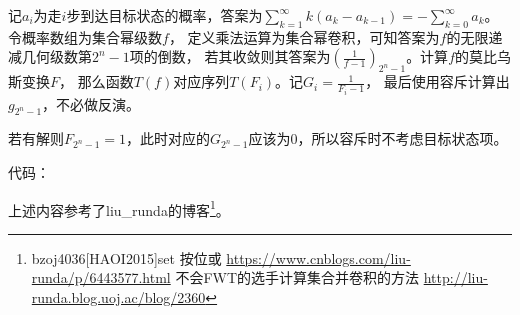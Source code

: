 记$a_i$为走$i$步到达目标状态的概率，答案为$\displaystyle \sum_{k=1}^
\infty{k(a_k-a_{k-1})}=-\sum_{k=0}^\infty a_k$。令概率数组为集合幂级数$f$，
定义乘法运算为集合幂卷积，可知答案为$f$的无限递减几何级数第$2^n-1$项的倒数，
若其收敛则其答案为$\left(\frac{1}{f-1}\right)_{2^n-1}$。计算$f$的莫比乌斯变换$F$，
那么函数$T(f)$对应序列${T(F_i)}$。记$G_i={\frac{1}{F_i-1}}$，
最后使用容斥计算出$g_{2^n-1}$，不必做反演。

若有解则$F_{2^n-1}=1$，此时对应的$G_{2^n-1}$应该为0，所以容斥时不考虑目标状态项。

代码：


上述内容参考了liu\_runda的博客\footnote{
    bzoj4036[HAOI2015]set 按位或
    \url{https://www.cnblogs.com/liu-runda/p/6443577.html}
    不会FWT的选手计算集合并卷积的方法
    \url{http://liu-runda.blog.uoj.ac/blog/2360}
}。

